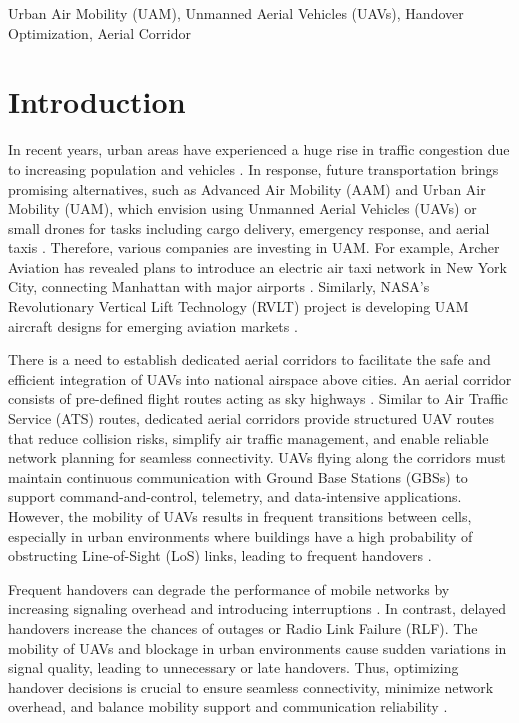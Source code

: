 \documentclass[10pt,conference]{IEEEtran}
\begin{document}
\begin{IEEEkeywords}
Urban Air Mobility (UAM), Unmanned
Aerial Vehicles (UAVs), Handover Optimization, Aerial Corridor
\end{IEEEkeywords}



\section{Introduction}
In recent years, urban areas have experienced a huge rise in traffic congestion due to increasing population and vehicles \cite{10718279}. In response, future transportation brings promising alternatives, such as Advanced Air Mobility (AAM) and Urban Air Mobility (UAM), which envision using Unmanned Aerial Vehicles (UAVs) or small drones for tasks including cargo delivery, emergency response, and aerial taxis \cite{cohen2021urban, 10793277}. Therefore, various companies are investing in UAM. For example, Archer Aviation has revealed plans to introduce an electric air taxi network in New York City, connecting Manhattan with major airports \cite{archer2025nyc}. Similarly, NASA's Revolutionary Vertical Lift Technology (RVLT) project is developing UAM aircraft designs for emerging aviation markets \cite{johnson2022nasa}. 

There is a need to establish dedicated aerial corridors to facilitate the safe and efficient integration of UAVs into national airspace above cities. An aerial corridor consists of pre-defined flight routes acting as sky highways \cite{10594734}. Similar to Air Traffic Service (ATS) routes, dedicated aerial corridors provide structured UAV routes that reduce collision risks, simplify air traffic management, and enable reliable network planning for seamless connectivity. UAVs flying along the corridors must maintain continuous communication with Ground Base Stations (GBSs) to support command-and-control, telemetry, and data-intensive applications. However, the mobility of UAVs results in frequent transitions between cells, especially in urban environments where buildings have a high probability of obstructing Line-of-Sight (LoS) links, leading to frequent handovers \cite{10746345}.

Frequent handovers can degrade the performance of mobile networks by increasing signaling overhead and introducing interruptions \cite{sonmez2024handover}. In contrast, delayed handovers increase the chances of outages or Radio Link Failure (RLF). The mobility of UAVs and blockage in urban environments cause sudden variations in signal quality, leading to unnecessary or late handovers. Thus, optimizing handover decisions is crucial to ensure seamless connectivity, minimize network overhead, and balance mobility support and communication reliability \cite{ullah2023survey}. 
\end{document}
